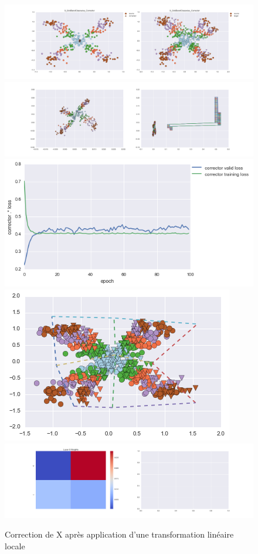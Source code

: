 \begin{figure}[H] %
\centering
\includegraphics[width=\linewidth]{fig/24-05-2016/X/X_GridBendClasswise_Corrector-DATA.png}
\includegraphics[width=\linewidth]{fig/24-05-2016/X/X_GridBendClasswise_Corrector-GridCheck.png}
\includegraphics[width=0.45\linewidth]{fig/24-05-2016/X/X_GridBendClasswise_Corrector-Learning_curve.png}
\includegraphics[width=0.45\linewidth]{fig/24-05-2016/X/X_grid.png}
\includegraphics[width=\linewidth]{fig/24-05-2016/X/X_GridBendClasswise_Corrector-W.png}
\caption{Correction de X après application d'une transformation linéaire locale}
\label{fig:recap-X-GridBend-classwise}
\end{figure}

